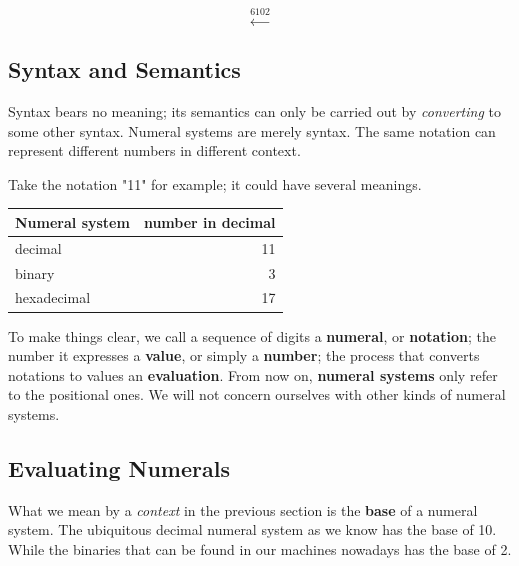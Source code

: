 \documentclass[../thesis.tex]{subfiles}
\begin{document}
$$ \xleftarrow{6102} $$

\subsection{Syntax and Semantics}

Syntax bears no meaning;
its semantics can only be carried out by \textit{converting} to some other syntax.
Numeral systems are merely syntax.
The same notation can represent different numbers in different context.

Take the notation "11" for example; it could have several meanings.

\begin{center}
    \begin{tabular}{ | l | r | }
    \textbf{Numeral system}      & \textbf{number in decimal}  \\
    \hline
    decimal             & 11    \\
    binary              & 3     \\
    hexadecimal         & 17    \\
    \end{tabular}
\end{center}

To make things clear, we call a sequence of digits a \textbf{numeral}, or \textbf{notation};
the number it expresses a \textbf{value}, or simply a \textbf{number};
the process that converts notations to values an \textbf{evaluation}.
From now on, \textbf{numeral systems} only refer to the positional ones.
We will not concern ourselves with other kinds of numeral systems.

\subsection{Evaluating Numerals}

What we mean by a \textit{context} in the previous section is the \textbf{base} of
a numeral system.
The ubiquitous decimal numeral system as we know has the base of 10.
While the binaries that can be found in our machines nowadays has the base of 2.
\end{document}
